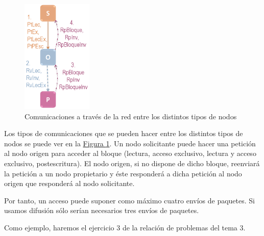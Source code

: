 \documentclass[10pt,a4paper,spanish]{report}
\begin{document}
\begin{figure}[!h]
\centering
\includegraphics[width=0.3\textwidth]{73}
\caption{Comunicaciones a través de la red entre los distintos tipos de nodos}
\label{com_red_msi_sin_dif}
\end{figure}

Los tipos de comunicaciones que se pueden hacer entre los distintos tipos de nodos se puede ver en la \hyperref[com_red_msi_sin_dif]{Figura \ref*{com_red_msi_sin_dif}}. Un nodo solicitante puede hacer una petición al nodo origen para acceder al bloque (lectura, acceso exclusivo, lectura y acceso exclusivo, postescritura). El nodo origen, si no dispone de dicho bloque, reenviará la petición a un nodo propietario y éste responderá a dicha petición al nodo origen que responderá al nodo solicitante.

Por tanto, un acceso puede suponer como máximo cuatro envíos de paquetes. Si usamos difusión sólo serían necesarios tres envíos de paquetes.

Como ejemplo, haremos el ejercicio 3 de la relación de problemas del tema 3.
\end{document}
